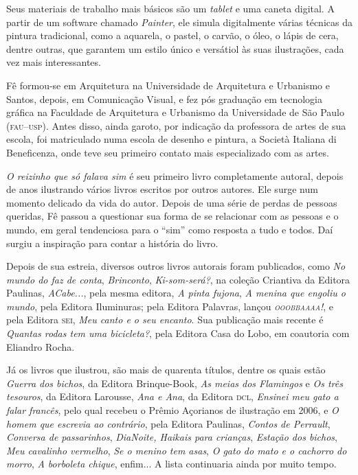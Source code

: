 \documentclass[11pt]{extarticle}
\begin{document}
Seus materiais de trabalho mais básicos são um \textit{tablet} e uma caneta digital.
A partir de um software chamado \textit{Painter}, ele simula digitalmente várias
técnicas da pintura tradicional, como a aquarela, o pastel, o carvão, o óleo, o lápis de cera,
dentre outras, que garantem um estilo único e versátiol às suas ilustrações, cada vez mais interessantes. 


Fê formou-se em Arquitetura na Universidade de Arquitetura e Urbanismo e Santos, 
depois, em Comunicação Visual, e fez pós graduação em tecnologia gráfica na Faculdade de
Arquitetura e Urbanismo da Universidade de São Paulo (\textsc{fau--usp}).
Antes disso, ainda garoto, por indicação da professora de artes de sua escola, 
foi matriculado numa escola de desenho e pintura, a Società Italiana di Beneficenza,
onde teve seu primeiro contato mais especializado com as artes. 

\textit{O reizinho que só falava sim} é seu primeiro livro completamente autoral,
depois de anos ilustrando vários livros escritos por outros autores. 
Ele surge num momento delicado da vida do autor. Depois de uma série de perdas
de pessoas queridas, Fê passou a questionar sua forma de se relacionar com 
as pessoas e o mundo, em geral tendenciosa para o ``sim'' como resposta a tudo e
todos. Daí surgiu a inspiração para contar a história do livro. 

Depois de sua estreia, diversos outros livros autorais foram publicados,
como \textit{No mundo do faz de conta}, \textit{Brinconto}, \textit{Ki-som-será?}, na coleção Criantiva
da Editora Paulinas, \textit{ACabe...}, pela mesma editora, \textit{A pinta fujona},
\textit{A menina que engoliu o mundo}, pela Editora Iluminuras; pela Editora 
Palavras, lançou \textit{\textsc{ooobbaaaa}!}, e pela Editora \textsc{sei},
\textit{Meu canto e o seu encanto}. Sua publicação mais recente é \textit{Quantas rodas tem uma bicicleta?},
pela Editora Casa do Lobo, em coautoria com Eliandro Rocha. 

Já os livros que ilustrou, são mais de quarenta títulos, dentre os quais estão \textit{Guerra dos bichos}, da Editora Brinque-Book, \textit{As meias dos Flamingos} e \textit{Os três tesouros}, da Editora Larousse,
\textit{Ana e Ana}, da Editora \textsc{dcl}, \textit{Ensinei meu gato a falar francês}, pelo qual recebeu o Prêmio Açorianos de ilustração em 2006, e \textit{O homem que escrevia ao contrário}, pela Editora Paulinas, \textit{Contos de Perrault}, \textit{Conversa de passarinhos}, \textit{DiaNoite, Haikais para crianças}, \textit{Estação dos bichos},
\textit{Meu cavalinho vermelho}, \textit{Se o menino tem asas}, \textit{O gato do mato e o cachorro do morro},
\textit{A borboleta chique}, enfim... A lista continuaria ainda por muito tempo. 
\end{document}
